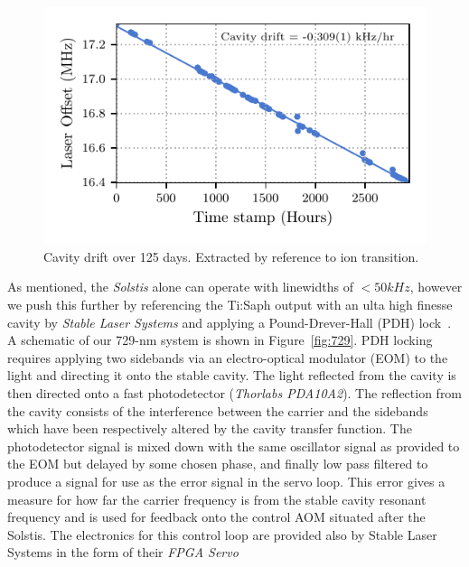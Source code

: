     \begin{figure}
        \begin{center}
        \noindent\includegraphics[width=\linewidth]{
            figures/pdf_figure/cavity_drift.pdf
            }
        \end{center}
        \caption{
            Cavity drift over 125 days. Extracted by reference to ion transition.
            }
        \label{fig:Cavity Drift}
    \end{figure}
    As mentioned, the \emph{Solstis} alone can operate with linewidths of
    $<50kHz$, however we push this further by referencing the Ti:Saph output
    with an ulta high finesse cavity by \emph{Stable Laser Systems} and applying
    a Pound-Drever-Hall (PDH) lock~\cite{}.  A schematic of our 729-nm system is
    shown in Figure~\ref{fig:729}.  PDH locking requires applying two sidebands
    via an electro-optical modulator (EOM) to the light and directing it onto
    the stable cavity. The light reflected from the cavity is then directed onto
    a fast photodetector (\emph{Thorlabs PDA10A2}). The reflection from the
    cavity consists of the interference between the carrier and the sidebands
    which have been respectively altered by the cavity transfer function. The
    photodetector signal is mixed down with the same oscillator signal as
    provided to the EOM but delayed by some chosen phase, and finally low pass
    filtered to produce a signal for use as the error signal in the servo loop.
    This error gives a measure for how far the carrier frequency is from the
    stable cavity resonant frequency and is used for feedback onto the control
    AOM situated after the Solstis. The electronics for this control loop are
    provided also by Stable Laser Systems in the form of their \emph{FPGA Servo}
